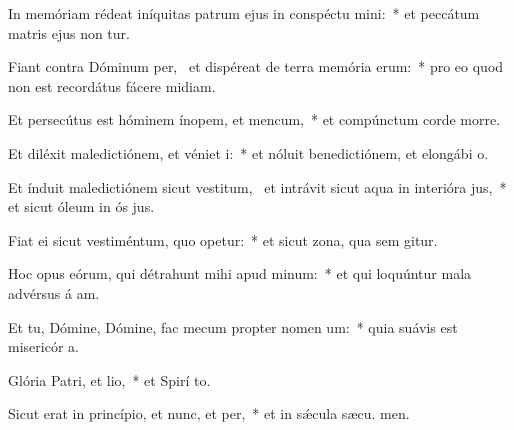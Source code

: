 \item In memóriam rédeat iníquitas patrum ejus in conspéctu mini:~* et peccátum matris ejus non tur.
\item Fiant contra Dóminum per,~\pscross{} et dispéreat de terra memória erum:~* pro eo quod non est recordátus fácere midiam.
\item Et persecútus est hóminem ínopem, et mencum,~* et compúnctum corde morre.
\item Et diléxit maledictiónem, et véniet i:~* et nóluit benedictiónem, et elongábi  o.
\item Et índuit maledictiónem sicut vestitum,~\pscross{} et intrávit sicut aqua in interióra jus,~* et sicut óleum in ós jus.
\item Fiat ei sicut vestiméntum, quo opetur:~* et sicut zona, qua sem gitur.
\item Hoc opus eórum, qui détrahunt mihi apud minum:~* et qui loquúntur mala advérsus á am.
\item Et tu, Dómine, Dómine, fac mecum propter nomen um:~* quia suávis est misericór a.
\item Glória Patri, et lio,~* et Spirí to.
\item Sicut erat in princípio, et nunc, et per,~* et in sǽcula sæcu. men.
